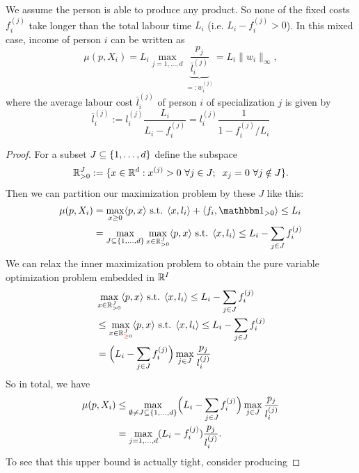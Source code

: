 \begin{lemma}
	We assume the person is able to produce any product. So none of the fixed
	costs \(f_i^{(j)}\) take longer than the total labour time \(L_i\) (i.e.
	\(L_i - f_i^{(j)} > 0\)). In this mixed case, income of person \(i\) can be
	written as		
	\[
		\mu(p, X_i)
		= L_i \max_{j=1,\dots,d}
		\underbrace{\frac{p_j}{\bar{l}_i^{(j)}}}_{=:w_i^{(j)}}
		= L_i \|w_i\|_\infty,
	\]
	where the average labour cost \(\bar{l}_i^{(j)}\) of person \(i\) of
	specialization \(j\) is given by
	\[
		\bar{l}_i^{(j)}
		:= l_i^{(j)}\frac{L_i}{L_i-f_i^{(j)}}
		= l_i^{(j)}\frac{1}{1-f_i^{(j)}/L_i}
	\]
\end{lemma}
\begin{proof}
	For a subset \(J\subseteq\{1,\dots,d\}\) define the subspace
	\[
		\mathbb{R}_{>0}^J:= \{
			x\in \mathbb{R}^d:
			x^{(j)} > 0\ \forall j\in J;\;\; x_j =0\ \forall j\notin J
		\}.
	\]
	Then we can partition our maximization problem by these \(J\) like this:
	\begin{align*}
		\mu(p, X_i)
		&= \max_{x\ge 0}\langle p, x\rangle \text{ s.t. }
		\langle x, l_i\rangle  + \langle f_i, \ind_{>0}\rangle \le L_i\\
		&= \max_{J \subseteq \{1,\dots,\dims\}}
		\max_{x\in \real_{>0}^J}
		\langle p, x\rangle \text{ s.t. }
		\langle x, l_i\rangle \le L_i - \sum_{j\in J}f_i^{(j)}
	\end{align*}	
	We can relax the inner maximization problem to obtain the pure variable
	optimization problem embedded in \(\mathbb{R}^I\)
	\begin{align*}
		&\max_{x\in \mathbb{R}_{>0}^J}
		\langle p, x\rangle \text{ s.t. }
		\langle x, l_i\rangle \le L_i - \sum_{j\in J}f_i^{(j)}\\
		&\le 
		\max_{x\in \mathbb{R}_{{\color{red} \ge} 0}^J}
		\langle p, x\rangle \text{ s.t. }
		\langle x, l_i\rangle \le L_i - \sum_{j\in J}f_i^{(j)}\\
		&= \Bigl(L_i - \sum_{j\in J}f_i^{(j)}\Bigr)
		\max_{j\in J} \frac{p_j}{l_i^{(j)}}
	\end{align*}
	So in total, we have
	\begin{align*}
		\mu(p, X_i)
		&\le \max_{\emptyset \neq J\subseteq \{1,\dots,d\}}
		\Bigl(L_i - \sum_{j\in J}f_i^{(j)}\Bigr)
		\max_{j\in J} \frac{p_j}{l_i^{(j)}}\\
		&= \max_{j=1,\dots,d}
		(L_i - f_i^{(j)}) \frac{p_j}{l_i^{(j)}}.
	\end{align*}
	To see that this upper bound is actually tight, consider producing

\end{proof}
